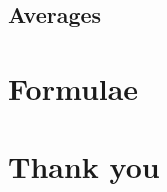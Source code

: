\documentclass{book}
\begin{document}
\chapter{Averages}




\part{Formulae}


\part{Thank you}
\end{document}
